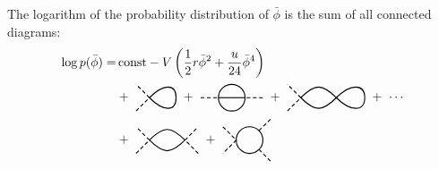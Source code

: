 \documentclass[11pt,a4paper]{article}
\begin{document}
The logarithm of the probability distribution of $\bar{\phi}$ is the sum of all
connected diagrams:
\begin{displaymath}
\begin{split}
    \log p(\bar{\phi}) = &\,
    \mathrm{const} -V \left(\frac{1}{2} r \bar{\phi}^2 + 
    \frac{u}{24} \bar{\phi}^4\right)\\
&+\ 
\begin{tikzpicture}[scale=0.5, baseline={([yshift=-.5ex]current bounding box.center)}]
    \draw[thick, densely dashed] (-1.75, -0.75) -- (-1, 0) -- (-1.75, 0.75);
    \draw[thick] (-1, 0) .. controls (-0.2, 0.8) and (0.5, 0.8) .. (0.5, 0) .. 
    controls (0.5, -0.8) and (-0.2, -0.8) .. (-1, 0);
\end{tikzpicture}
\ + \ 
\begin{tikzpicture}[scale=0.5, baseline={([yshift=-.5ex]current bounding box.center)}]
    \draw[thick, densely dashed] (-1.75, 0) -- (-0.75, 0);
    \draw[thick] (-0.75, 0) -- (0.75, 0);
    \draw[thick, densely dashed] (1.75, 0) -- (0.75, 0);
    \draw[thick] (0, 0) circle (0.75cm);
\end{tikzpicture}
\ + \ 
\begin{tikzpicture}[scale=0.5, baseline={([yshift=-.5ex]current bounding box.center)}]
    \draw[thick, densely dashed] (-2.75, -0.75) -- (-2, 0) -- (-2.75, 0.75);
    \draw[thick] (-2, 0) .. controls (-1.2, 0.8) and (-0.8, 0.8) .. (0, 0) .. 
    controls (-0.8, -0.8) and (-1.2, -0.8) .. (-2, 0);
    \draw[thick] (1.6, 0) .. controls (1.6, 0.8) and (0.8, 0.8) .. (0, 0) .. 
    controls (0.8, -0.8) and (1.6, -0.8) .. (1.6, 0);
\end{tikzpicture}
 \ + \ \cdots \\
&+\ 
\begin{tikzpicture}[scale=0.5, baseline={([yshift=-.5ex]current bounding box.center)}]
    \draw[thick, densely dashed] (-1.75, -0.75) -- (-1, 0) -- (-1.75, 0.75);
    \draw[thick, densely dashed] (1.75, -0.75) -- (1, 0) -- (1.75, 0.75);
    \draw[thick] (-1, 0) .. controls (-0.2, 0.8) and (0.2, 0.8) .. (1, 0) .. 
    controls (0.2, -0.8) and (-0.2, -0.8) .. (-1, 0);
\end{tikzpicture}
\ + \ 
\begin{tikzpicture}[scale=0.5, baseline={([yshift=-.5ex]current bounding box.center)}]
    \draw[thick, densely dashed] (-1.5, 0.75) -- (-0.75, 0) -- (-1.5, -0.75) ;
    \draw[thick] (0, 0) circle (0.75cm);
    \draw[thick, densely dashed] (0.53, 0.53) -- (1.25, 1.25);
    \draw[thick, densely dashed] (0.53, -0.53) -- (1.25, -1.25);

\end{tikzpicture}
\end{split}
\end{displaymath}
\end{document}
